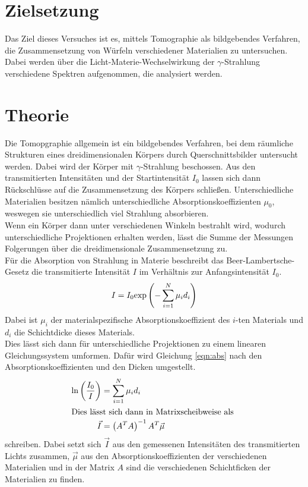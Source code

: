 \section{Zielsetzung}
Das Ziel dieses Versuches ist es, mittels Tomographie als bildgebendes Verfahren, die Zusammensetzung von Würfeln verschiedener Materialien zu untersuchen.
Dabei werden über die Licht-Materie-Wechselwirkung der $\gamma$-Strahlung verschiedene Spektren aufgenommen, die analysiert werden.
	
\section{Theorie}

\noindent
Die Tomopgraphie allgemein ist ein bildgebendes Verfahren, bei dem räumliche Strukturen eines dreidimensionalen Körpers durch Querschnittsbilder untersucht werden.
Dabei wird der Körper mit $\gamma$-Strahlung beschossen. Aus den transmitierten Intensitäten und der Startintensität $I_0$ lassen sich dann Rückschlüsse auf die Zusammensetzung des Körpers schließen.
Unterschiedliche Materialien besitzen nämlich unterschiedliche Absorptionskoeffizienten $\mu_0$, weswegen sie unterschiedlich viel Strahlung absorbieren.\\
Wenn ein Körper dann unter verschiedenen Winkeln bestrahlt wird, wodurch unterschiedliche Projektionen erhalten werden, lässt die Summe der Messungen Folgerungen über die dreidimensionale Zusammensetzung zu.\\
Für die Absorption von Strahlung in Materie beschreibt das Beer-Lambertsche-Gesetz die transmitierte Intensität $I$ im Verhältnis zur Anfangsintensität $I_0$.
\begin{equation}
    I = I_0 \text{exp}\left(- \sum_{i=1}^N \mu_i d_i\right)
    \label{eqn:abs}
\end{equation}
Dabei ist $\mu_i$ der materialspezifische Absorptionskoeffizient des $i$-ten Materials und $d_i$ die Schichtdicke dieses Materials.\\
Dies lässt sich dann für unterschiedliche Projektionen zu einem linearen Gleichungssystem umformen. 
Dafür wird Gleichung \ref{eqn:abs} nach den Absorptionskoeffizienten und den Dicken umgestellt.
\begin{align}
    \ln\left(\frac{I_0}{I}\right) &= \sum_{i=1}^N \mu_i d_i \label{eqn:ln}\\
    \intertext{Dies lässt sich dann in Matrixscheibweise als }
    \vec I &=\left(A^T  A\right)^{-1} A^T \vec \mu
    \label{eqn:mu}
\end{align}
schreiben. Dabei setzt sich $\vec I$ aus den gemessenen Intensitäten des transmitierten Lichts zusammen, $\vec \mu$ aus den Absorptionskoeffizienten der verschiedenen Materialien
und in der Matrix $ A$ sind die verschiedenen Schichtficken der Materialien zu finden.\\

